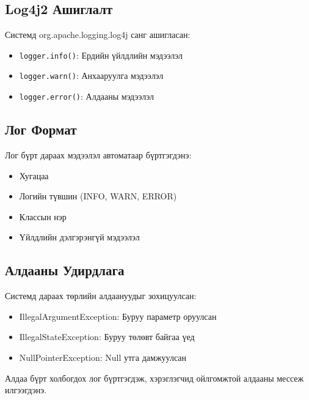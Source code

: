 \documentclass[a4paper, 11pt]{article}
\begin{document}
\subsection*{Log4j2 Ашиглалт}
Системд org.apache.logging.log4j санг ашигласан:

\begin{itemize}
    \item \texttt{logger.info()}: Ердийн үйлдлийн мэдээлэл
    \item \texttt{logger.warn()}: Анхааруулга мэдээлэл
    \item \texttt{logger.error()}: Алдааны мэдээлэл
\end{itemize}

\subsection*{Лог Формат}
Лог бүрт дараах мэдээлэл автоматаар бүртгэгдэнэ:

\begin{itemize}
    \item Хугацаа
    \item Логийн түвшин (INFO, WARN, ERROR)
    \item Классын нэр
    \item Үйлдлийн дэлгэрэнгүй мэдээлэл
\end{itemize}

\subsection*{Алдааны Удирдлага}
Системд дараах төрлийн алдаануудыг зохицуулсан:

\begin{itemize}
    \item {IllegalArgumentException}: Буруу параметр оруулсан
    \item {IllegalStateException}: Буруу төлөвт байгаа үед
    \item {NullPointerException}: Null утга дамжуулсан
\end{itemize}

Алдаа бүрт холбогдох лог бүртгэгдэж, хэрэглэгчид ойлгомжтой алдааны мессеж илгээгдэнэ.
\end{document}
